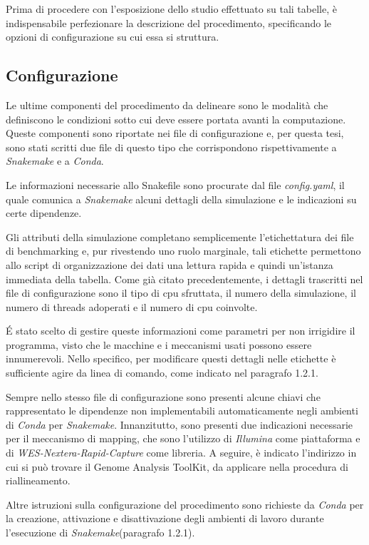 Prima di procedere con l'esposizione dello studio effettuato su tali tabelle, è indispensabile perfezionare la descrizione del procedimento, specificando le opzioni di configurazione su cui essa si struttura.


\subsection{Configurazione}
Le ultime componenti del procedimento da delineare sono le modalità che definiscono le condizioni sotto cui deve essere portata avanti la computazione.
Queste componenti sono riportate nei file di configurazione e, per questa tesi, sono stati scritti due file di questo tipo che corrispondono rispettivamente a \textit{Snakemake} e a \textit{Conda}.

Le informazioni necessarie allo Snakefile sono procurate dal file \textit{config.yaml}, il quale comunica a \textit{Snakemake} alcuni dettagli della simulazione e le indicazioni su certe dipendenze.


Gli attributi della simulazione completano semplicemente l'etichettatura dei file di benchmarking e, pur rivestendo uno ruolo marginale, tali etichette permettono allo script di organizzazione dei dati una lettura rapida e quindi un'istanza immediata della tabella.
Come già citato precedentemente, i dettagli trascritti nel file di configurazione sono il tipo di cpu sfruttata, il numero della simulazione, il numero di threads adoperati e il numero di cpu coinvolte.

\'E stato scelto di gestire queste informazioni come parametri per non irrigidire il programma, visto che le macchine e i meccanismi usati possono essere innumerevoli.
Nello specifico, per modificare questi dettagli nelle etichette è sufficiente agire da linea di comando, come indicato nel paragrafo 1.2.1.

Sempre nello stesso file di configurazione sono presenti alcune chiavi che rappresentato le dipendenze non implementabili automaticamente negli ambienti di \textit{Conda} per \textit{Snakemake}.
Innanzitutto, sono presenti due indicazioni necessarie per il meccanismo di mapping, che sono l'utilizzo di \textit{Illumina} come piattaforma e di \textit{WES-Nextera-Rapid-Capture} come libreria.
A seguire, è indicato l'indirizzo in cui si può trovare il Genome Analysis ToolKit, da applicare nella procedura di riallineamento.

Altre istruzioni sulla configurazione del procedimento sono richieste da \textit{Conda} per la creazione, attivazione e disattivazione degli ambienti di lavoro durante l'esecuzione di \textit{Snakemake}(paragrafo 1.2.1).

